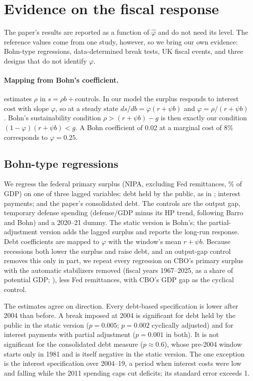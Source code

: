 \section{Evidence on the fiscal response}\label{app:fiscal}
\setcounter{table}{0}\setcounter{figure}{0}

The paper's results are reported as a function of $\hat\varphi$ and do not need its level. The reference values come from one study, however, so we bring our own evidence: Bohn-type regressions, data-determined break tests, UK fiscal events, and three designs that do not identify $\varphi$.

\paragraph{Mapping from Bohn's coefficient.} \citet{bohn1998} estimates $\rho$ in $s=\rho b+\text{controls}$. In our model the surplus responds to interest cost with slope $\varphi$, so at a steady state $ds/db=\varphi(r+\psi b)$ and $\varphi=\rho/(r+\psi b)$. Bohn's sustainability condition $\rho>(r+\psi b)-g$ is then exactly our condition $(1-\varphi)(r+\psi b)<g$. A Bohn coefficient of 0.02 at a marginal cost of 8\% corresponds to $\varphi=0.25$.

\subsection{Bohn-type regressions}\label{app:bohn}

We regress the federal primary surplus (NIPA, excluding Fed remittances, \% of GDP) on one of three lagged variables: debt held by the public, as in \citet{bohn1998}; interest payments; and the paper's consolidated debt. The controls are the output gap, temporary defense spending (defense/GDP minus its HP trend, following Barro and Bohn) and a 2020--21 dummy. The static version is Bohn's; the partial-adjustment version adds the lagged surplus and reports the long-run response. Debt coefficients are mapped to $\varphi$ with the window's mean $r+\psi b$. Because recessions both lower the surplus and raise debt, and an output-gap control removes this only in part, we repeat every regression on CBO's primary surplus with the automatic stabilizers removed (fiscal years 1967--2025, as a share of potential GDP; \citealp{cbo2026}), less Fed remittances, with CBO's GDP gap as the cyclical control.



The estimates agree on direction. Every debt-based specification is lower after 2004 than before. A break imposed at 2004 is significant for debt held by the public in the static version ($p=0.005$; $p=0.002$ cyclically adjusted) and for interest payments with partial adjustment ($p=0.001$ in both). It is not significant for the consolidated debt measure ($p\approx0.6$), whose pre-2004 window starts only in 1981 and is itself negative in the static version. The one exception is the interest specification over 2004--19, a period when interest costs were low and falling while the 2011 spending caps cut deficits; its standard error exceeds 1.

